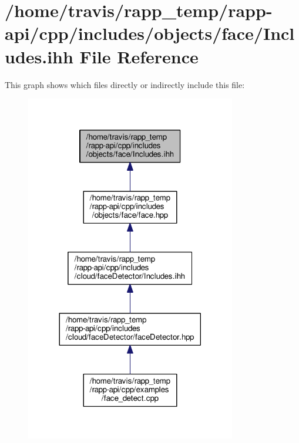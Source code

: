 \hypertarget{objects_2face_2Includes_8ihh}{\section{/home/travis/rapp\-\_\-temp/rapp-\/api/cpp/includes/objects/face/\-Includes.ihh File Reference}
\label{objects_2face_2Includes_8ihh}
}
This graph shows which files directly or indirectly include this file\-:
\nopagebreak
\begin{figure}[H]
\begin{center}
\leavevmode
\includegraphics[width=260pt]{objects_2face_2Includes_8ihh__dep__incl}
\end{center}
\end{figure}
